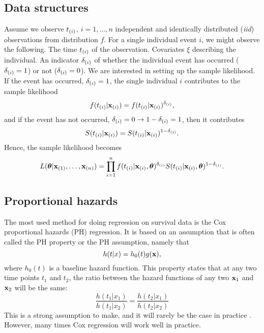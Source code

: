 \subsection{Data structures}\label{sec:surv-data}
Assume we observe $t_{(i)}$, $i=1,\dotsc,n$ independent and identically distributed (\textit{iid}) observations from distribution $f$. For a single individual event $i$, we might observe the following. The time $t_{(i)}$ of the observation. Covariates $\xi$ describing the individual. An indicator $\delta_{(i)}$ of whether the individual event has occurred ($\delta_{(i)} = 1$) or not ($\delta_{(i)} = 0$). We are interested in setting up the sample likelihood. If the event has occurred, $\delta_{(i)}=1$, the single individual $i$ contributes to the sample likelihood
\begin{equation*}
    f(t_{(i)}|\mathbf{x}_{(i)})=f(t_{(i)}|\mathbf{x}_{(i)})^{\delta_{(i)}},
\end{equation*}
and if the event has not occurred, $\delta_{(i)}=0\rightarrow1-\delta_{(i)}=1$, then it contributes
\begin{equation*}
    S(t_{(i)}|\mathbf{x}_{(i)})=S(t_{(i)}|\mathbf{x}_{(i)})^{1-\delta_{(i)}}.
\end{equation*}
Hence, the sample likelihood becomes
\begin{equation}\label{eq:surv-lik}
    L(\boldsymbol{\theta}|\mathbf{x}_{(1)},\ldots,\mathbf{x}_{(n)})=\prod_{i=1}^n f(t_{(i)}|\mathbf{x}_{(i)},\boldsymbol{\theta})^{\delta_{(i)}} S(t_{(i)}|\mathbf{x}_{(i)},\boldsymbol{\theta})^{1-\delta_{(i)}}.
\end{equation}
\subsection{Proportional hazards}
The most used method for doing regression on survival data is the Cox proportional hazards (PH) regression. It is based on an assumption that is often called the PH property or the PH assumption, namely that
\begin{equation}
    h(t|x)=h_0(t)g(\mathbf{x}),
\end{equation}
where $h_0(t)$ is a baseline hazard function.  This property states that at any two time points $t_1$ and $t_2$, the ratio between the hazard functions of any two $\mathbf{x}_1$ and $\mathbf{x}_2$ will be the same:
\begin{equation}
    \frac{h(t_1|x_1)}{h(t_1|x_2)}=\frac{h(t_2|x_1)}{h(t_2|x_2)}
\end{equation}
This is a strong assumption to make, and it will rarely be the case in practice \citep{lee2010}. However, many times Cox regression will work well in practice. 

